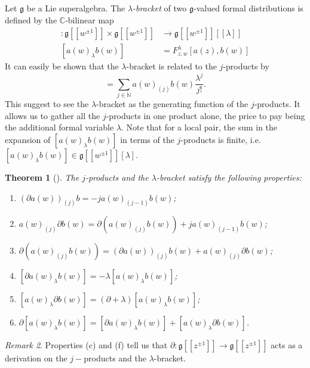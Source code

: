 \documentclass[a4paper, 12pt, reqno]{amsart}
\newtheorem{theorem}{Theorem}[subsection]
\theoremstyle{remark}
\newtheorem{remark}[theorem]{Remark}
\numberwithin{equation}{subsection}
\begin{document}
Let $\mathfrak{g}$ be a Lie superalgebra.
The \emph{$\lambda$-bracket} of two $\mathfrak{g}$-valued formal distributions is defined by the $\mathbb{C}$-bilinear map
\begin{align*}
  [\bullet_{\lambda}\bullet]: \mathfrak{g}[[w^{\pm 1}]]\times \mathfrak{g}[[w^{\pm 1}]] &\to \mathfrak{g}[[w^{\pm 1}]][[\lambda]] \\
  [a(w)_{\lambda}b(w)] &= F^{\lambda}_{z, w}[a(z), b(w)]
\end{align*}
It can easily be shown that the $\lambda$-bracket is related to the $j$-products by
\begin{equation*}
  [a(w)_{\lambda}b(w)] = \sum_{j \in \mathbb{N}}a(w)_{(j)}b(w)\frac{\lambda^j}{j!}.
\end{equation*}
This suggest to see the $\lambda$-bracket as the generating function of the $j$-products.
It allows us to gather all the $j$-products in one product alone, the price to pay being the additional formal variable $\lambda$.
Note that for a local pair, the sum in the expansion of $[a(w)_{\lambda} b(w)]$ in terms of the $j$-products is finite, i.e.\ $[a(w)_{\lambda}b(w)] \in \mathfrak{g}[[w^{\pm 1}]][\lambda]$.

\begin{theorem}[{\cite[Section 2.3]{nozaradan_introduction_2008}}]
  \label{thr:2}
  The $j$-products and the $\lambda$-bracket satisfy the following properties:
  \begin{enumerate}[label = (\alph*)]
  \item $(\partial a(w))_{(j)}b = -ja(w)_{(j - 1)}b(w)$;
  \item $a(w)_{(j)}\partial b(w) = \partial(a(w)_{(j)}b(w)) + ja(w)_{(j - 1)}b(w)$;
  \item $\partial(a(w)_{(j)}b(w))=(\partial a(w))_{(j)}b(w)+a(w)_{(j)}\partial b(w)$;
  \item $[\partial a(w)_{\lambda}b(w)] = -\lambda [a(w)_{\lambda}b(w)]$;
  \item $[a(w)_{\lambda}\partial b(w)] = (\partial + \lambda)[a(w)_{\lambda}b(w)]$;
  \item $\partial[a(w)_\lambda b(w)]=[\partial a(w)_\lambda b(w)]+[a(w)_\lambda \partial b(w)]$.
  \end{enumerate}
\end{theorem}
\begin{remark}
  \label{rmk:2}
  Properties (c) and (f) tell us that $\partial: \mathfrak{g}[[z^{\pm 1}]] \to \mathfrak{g}[[z^{\pm 1}]]$ acts as a derivation on the $j-$products and the $\lambda$-bracket.
\end{remark}
\end{document}
